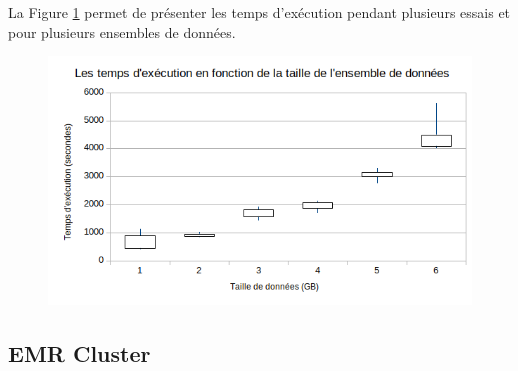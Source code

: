 \begin{table}[H]
	\centering
	\captionsetup{justification=centering}
	\caption{Les temps d'exécution lors de la détection des anomalies en utilisant Spark (approche $2$)}
	\label{tab:spark-timing-reajustedcode}
\end{table}


La Figure 	\ref{fig:moustachespark} permet de présenter les temps d'exécution pendant plusieurs essais et pour plusieurs ensembles de données.
\begin{figure}[H]
	\centering
	\includegraphics[width=0.7\linewidth]{illustrations/moustacheSpark}
	\caption{}
	\label{fig:moustachespark}
\end{figure}

\subsection{EMR Cluster}

